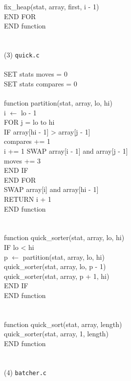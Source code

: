 \documentclass[12pt]{article}
\begin{document}
\indent \indent fix\_heap(stat, array, first, i - 1) \\
\indent END FOR \\
END function \\
\\
\\
(3) \texttt{quick.c} \\
\\
SET stats moves = 0 \\
SET stats compares = 0 \\
\\
function partition(stat, array, lo, hi) \\
\indent i $\leftarrow$ lo - 1 \\
\indent FOR j = lo to hi \\
\indent \indent IF array[hi - 1] > array[j - 1] \\
\indent \indent \indent compares += 1 \\
\indent \indent \indent i += 1 
\indent \indent \indent SWAP array[i - 1] and array[j - 1] \\
\indent \indent \indent moves += 3 \\
\indent \indent END IF \\
\indent END FOR \\
\indent SWAP array[i] and array[hi - 1] \\
\indent RETURN i + 1 \\
END function \\
\\
\\
function quick\_sorter(stat, array, lo, hi) \\
\indent IF lo < hi \\
\indent \indent p $\leftarrow$ partition(stat, array, lo, hi) \\
\indent \indent quick\_sorter(stat, array, lo, p - 1) \\
\indent \indent quick\_sorter(stat, array, p + 1, hi) \\
\indent END IF \\
END function \\
\\
\\
function quick\_sort(stat, array, length) \\
\indent quick\_sorter(stat, array, 1, length) \\
END function \\
\\
\\
(4) \texttt{batcher.c} \\
\end{document}
